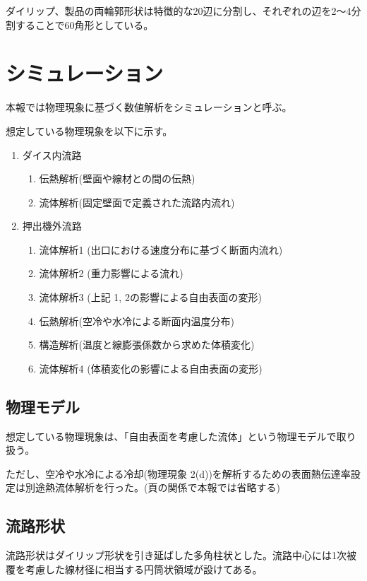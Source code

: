 \documentclass[report]{jlreq}
\begin{document}
ダイリップ、製品の両輪郭形状は特徴的な20辺に分割し、それぞれの辺を2～4分割することで60角形としている。

\newpage

\section{シミュレーション}
本報では物理現象に基づく数値解析をシミュレーションと呼ぶ。

想定している物理現象を以下に示す。

\begin{enumerate}
  \item ダイス内流路
  \begin{enumerate}
    \item 伝熱解析(壁面や線材との間の伝熱)
    \item 流体解析(固定壁面で定義された流路内流れ)
  \end{enumerate}
  \item 押出機外流路
  \begin{enumerate}
    \item 流体解析1 (出口における速度分布に基づく断面内流れ)
    \item 流体解析2 (重力影響による流れ)
    \item 流体解析3 (上記 1, 2の影響による自由表面の変形)
    \item 伝熱解析(空冷や水冷による断面内温度分布)
    \item 構造解析(温度と線膨張係数から求めた体積変化)
    \item 流体解析4 (体積変化の影響による自由表面の変形)
  \end{enumerate}
\end{enumerate}


\subsection{物理モデル}
想定している物理現象は、「自由表面を考慮した流体」という物理モデルで取り扱う。

ただし、空冷や水冷による冷却({\small 物理現象 2(d)})を解析するための表面熱伝達率設定は別途熱流体解析を行った。({\small 頁の関係で本報では省略する})

\subsection{流路形状}
流路形状はダイリップ形状を引き延ばした多角柱状とした。流路中心には1次被覆を考慮した線材径に相当する円筒状領域が設けてある。
\end{document}
